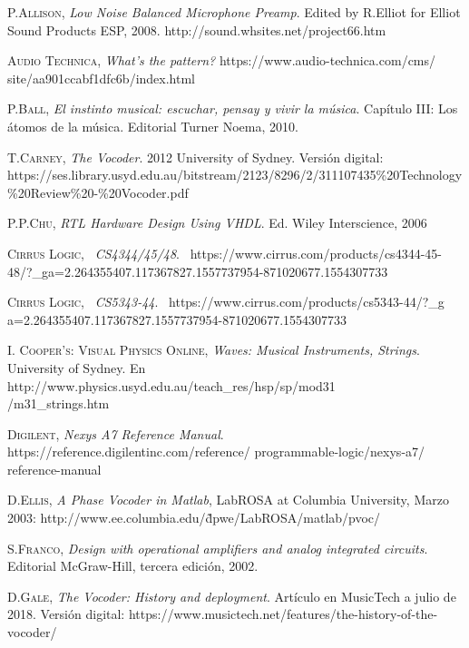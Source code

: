 \documentclass[a4paper, 11pt, oneside, openright]{report}
\begin{document}
\begin{thebibliography}{aa}


	\textsc{P.Allison},
	\textit{Low Noise Balanced Microphone Preamp}.
	Edited by R.Elliot for	
	Elliot Sound Products ESP, 2008.
	http://sound.whsites.net/project66.htm
	
	\textsc{Audio Technica},
	\textit{What's the pattern?}
	https://www.audio-technica.com/cms/ site/aa901ccabf1dfc6b/index.html
	
	\textsc{P.Ball},
	\textit{El instinto musical: escuchar, pensay y vivir la música}. Capítulo III: Los átomos de la música. Editorial Turner Noema, 2010.
	
	\textsc{T.Carney},
	\textit{The Vocoder}. 2012 University of Sydney. Versión digital:
	https://ses.library.usyd.edu.au/bitstream/2123/8296/2/311107435\%20Technology\\\%20Review\%20-\%20Vocoder.pdf
	
	\textsc{P.P.Chu},
	\textit{RTL Hardware Design Using VHDL}.
	Ed. Wiley Interscience, 2006
	
	\textsc{Cirrus Logic},~
	\textit{CS4344/45/48}.~
	https://www.cirrus.com/products/cs4344-45-48/?\_ga=2.264355407.117367827.1557737954-871020677.1554307733
	
	\textsc{Cirrus Logic},~
	\textit{CS5343-44}.~
	https://www.cirrus.com/products/cs5343-44/?\_g a=2.264355407.117367827.1557737954-871020677.1554307733
	
	\textsc{I. Cooper's: Visual Physics Online},
	\textit{Waves: Musical Instruments, Strings}. University of Sydney. En
	http://www.physics.usyd.edu.au/teach\_res/hsp/sp/mod31\\/m31\_strings.htm
	
	\textsc{Digilent},
	\textit{Nexys A7 Reference Manual}.
	https://reference.digilentinc.com/reference/ programmable-logic/nexys-a7/	  reference-manual
	
	\textsc{D.Ellis},
	\textit{A Phase Vocoder in Matlab},
	LabROSA at Columbia University,
	Marzo 2003: 
	http://www.ee.columbia.edu/\~dpwe/LabROSA/matlab/pvoc/
	
	\textsc{S.Franco},
	\textit{Design with operational amplifiers and analog integrated circuits}. Editorial McGraw-Hill, tercera edición, 2002.
	
	\textsc{D.Gale},
	\textit{The Vocoder: History and deployment}. Artículo en MusicTech a julio de 2018. Versión digital:
	https://www.musictech.net/features/the-history-of-the-vocoder/


\end{thebibliography}
\end{document}
